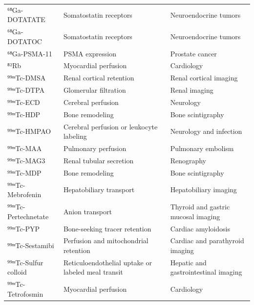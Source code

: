 \begin{longtable}{@{}p{}p{}p{}@{}}
⁶⁸Ga-DOTATATE & Somatostatin receptors & Neuroendocrine tumors \\
⁶⁸Ga-DOTATOC & Somatostatin receptors & Neuroendocrine tumors \\
⁶⁸Ga-PSMA-11 & PSMA expression & Prostate cancer \\
⁸²Rb & Myocardial perfusion & Cardiology \\
⁹⁹ᵐTc-DMSA & Renal cortical retention & Renal cortical imaging \\
⁹⁹ᵐTc-DTPA & Glomerular filtration & Renal imaging \\
⁹⁹ᵐTc-ECD & Cerebral perfusion & Neurology \\
⁹⁹ᵐTc-HDP & Bone remodeling & Bone scintigraphy \\
⁹⁹ᵐTc-HMPAO & Cerebral perfusion or leukocyte labeling & Neurology and infection \\
⁹⁹ᵐTc-MAA & Pulmonary perfusion & Pulmonary embolism \\
⁹⁹ᵐTc-MAG3 & Renal tubular secretion & Renography \\
⁹⁹ᵐTc-MDP & Bone remodeling & Bone scintigraphy \\
⁹⁹ᵐTc-Mebrofenin & Hepatobiliary transport & Hepatobiliary imaging \\
⁹⁹ᵐTc-Pertechnetate & Anion transport & Thyroid and gastric mucosal imaging \\
⁹⁹ᵐTc-PYP & Bone-seeking tracer retention & Cardiac amyloidosis \\
⁹⁹ᵐTc-Sestamibi & Perfusion and mitochondrial retention & Cardiac and parathyroid imaging \\
⁹⁹ᵐTc-Sulfur colloid & Reticuloendothelial uptake or labeled meal transit & Hepatic and gastrointestinal imaging \\
⁹⁹ᵐTc-Tetrofosmin & Myocardial perfusion & Cardiology \\
\bottomrule
\end{longtable}

